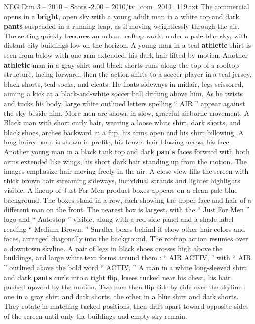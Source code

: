 \begin{textsample}{NEG Dim 3 – 2010 – Score -2.00 – 2010/tv\_com\_2010\_119.txt}  \label{ex:f3_neg_019}
The commercial opens in a \textbf{bright}, open sky with a young adult man in a white top and dark \textbf{pants} suspended in a running leap, as if moving weightlessly through the air.
The setting quickly becomes an urban rooftop world under a pale blue sky, with distant city buildings low on the horizon.
A young man in a teal \textbf{athletic} shirt is seen from below with one arm extended, his dark hair lifted by motion.
Another \textbf{athletic} man in a gray shirt and black shorts runs along the top of a rooftop structure, facing forward, then the action shifts to a soccer player in a teal jersey, black shorts, teal socks, and cleats.
He floats sideways in midair, legs scissored, aiming a kick at a black-and-white soccer ball drifting above him.
As he twists and tucks his body, large white outlined letters spelling “ AIR ” appear against the sky beside him.
More men are shown in slow, graceful airborne movement.
A Black man with short curly hair, wearing a loose white shirt, dark shorts, and black shoes, arches backward in a flip, his arms open and his shirt billowing.
A long-haired man is shown in profile, his brown hair blowing across his face.
Another young man in a black tank top and dark \textbf{pants} faces forward with both arms extended like wings, his short dark hair standing up from the motion.
The images emphasize hair moving freely in the air.
A close view fills the screen with thick brown hair streaming sideways, individual strands and lighter highlights visible.
A lineup of Just For Men product boxes appears on a clean pale blue background.
The boxes stand in a row, each showing the upper face and hair of a different man on the front.
The nearest box is largest, with the “ Just For Men ” logo and “ Autostop ” visible, along with a red side panel and a shade label reading “ Medium Brown. ” Smaller boxes behind it show other hair colors and faces, arranged diagonally into the background.
The rooftop action resumes over a downtown skyline.
A pair of legs in black shoes crosses high above the buildings, and large white text forms around them : “ AIR ACTIV, ” with “ AIR ” outlined above the bold word “ ACTIV. ” A man in a white long-sleeved shirt and dark \textbf{pants} curls into a tight flip, knees tucked near his chest, his hair pushed upward by the motion.
Two men then flip side by side over the skyline : one in a gray shirt and dark shorts, the other in a blue shirt and dark shorts.
They rotate in matching tucked positions, then drift apart toward opposite sides of the screen until only the buildings and empty sky remain.

\end{textsample}
